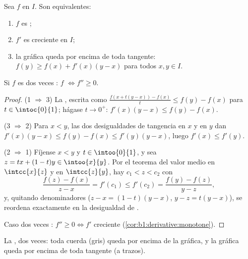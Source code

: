 \begin{theorem}\label{thm:b1:derivative:convexchar}
Sea $f$  en $I$. Son equivalentes:
\begin{enumerate}
  \item $f$ es ;
  \item $f'$ es creciente en $I$;
  \item la gráfica queda por encima de toda tangente:
        $f(y) \geq f(x) + f'(x)(y - x)$ para todos $x, y \in I$.
\end{enumerate}
Si $f$ es dos veces : $f$  $\iff f'' \geq 0$.
\end{theorem}

\begin{proof}
(1 $\Rightarrow$ 3) La , escrita como
$\frac{f(x + t(y-x)) - f(x)}{t} \leq f(y) - f(x)$ para
$t \in \intoc{0}{1}$; hágase $t \to 0^+$:
$f'(x)(y - x) \leq f(y) - f(x)$.

(3 $\Rightarrow$ 2) Para $x < y$, las dos desigualdades de tangencia
en $x$ y en $y$ dan $f'(x)(y-x) \leq f(y) - f(x) \leq f'(y)(y - x)$,
luego $f'(x) \leq f'(y)$.

(2 $\Rightarrow$ 1) Fíjense $x < y$ y $t \in \intoo{0}{1}$, y sea
$z = tx + (1-t)y \in \intoo{x}{y}$. Por el teorema del valor medio en
$\intcc{x}{z}$ y en $\intcc{z}{y}$, hay $c_1 < z < c_2$ con
\[
\frac{f(z) - f(x)}{z - x} = f'(c_1) \leq f'(c_2)
= \frac{f(y) - f(z)}{y - z} ,
\]
y, quitando denominadores ($z - x = (1-t)(y-x)$, $y - z = t(y-x)$), se
reordena exactamente en la desigualdad de .

Caso dos veces : $f'' \geq 0 \iff f'$ creciente
(\cref{cor:b1:derivative:monotone}).
\end{proof}

\begin{omfigure}

{\small La , dos veces: toda cuerda (gris) queda por encima
de la gráfica, y la gráfica queda por encima de toda tangente (a trazos).}
\end{omfigure}

